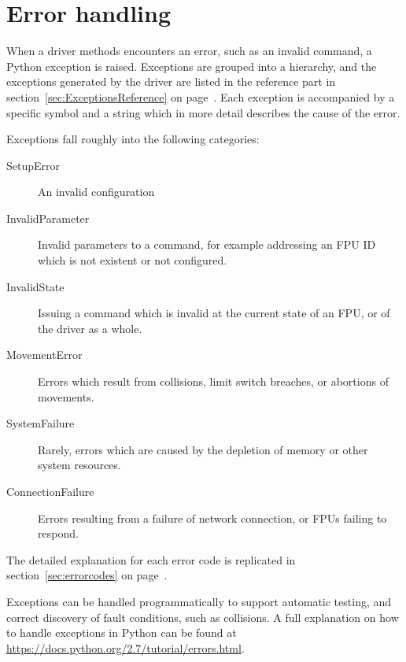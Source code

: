 \documentclass[11pt,a4paper]{report}
\begin{document}
\section{Error handling}
\label{sec:errorhandling}
When a driver methods encounters an error, such as an invalid command,
a Python exception is raised. Exceptions are grouped into a hierarchy,
and the exceptions generated by the driver are listed in the reference
part in section~\ref{sec:ExceptionsReference} on
page~\pageref{sec:ExceptionsReference}. Each exception is accompanied
by a specific symbol and a string which in more detail describes the
cause of the error.

Exceptions fall roughly into the following categories:

\begin{description}
  \item[SetupError] An invalid configuration 
  \item[InvalidParameter] Invalid parameters to a command, for example addressing an FPU
    ID which is not existent or not configured.
  \item[InvalidState] Issuing a command which is invalid at the current state of
    an FPU, or of the driver as a whole.
  \item[MovementError] Errors which result from collisions, limit switch breaches,
    or abortions of movements.
  \item[SystemFailure] Rarely, errors which are caused by the depletion of memory
    or other system resources.
  \item[ConnectionFailure] Errors resulting from a failure of network connection, or FPUs failing to respond.
\end{description}

The detailed explanation for each error code is replicated in
section~\ref{sec:errorcodes} on page~\pageref{sec:errorcodes}.

Exceptions can be handled programmatically to support automatic
testing, and correct discovery of fault conditions, such as
collisions. A full explanation on how to handle exceptions in Python can
be found at \url{https://docs.python.org/2.7/tutorial/errors.html}.
\end{document}
